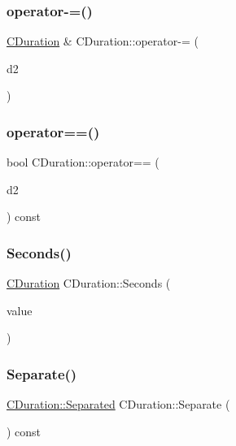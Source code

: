\subsubsection{\texorpdfstring{operator-\/=()}{operator-=()}}
{\footnotesize\ttfamily \mbox{\hyperlink{class_c_duration}{C\+Duration}} \& C\+Duration\+::operator-\/= (\begin{DoxyParamCaption}\item[{const \mbox{\hyperlink{class_c_duration}{C\+Duration}} \&}]{d2 }\end{DoxyParamCaption})}

\mbox{\label{class_c_duration_a1278f84b8c078fee677ab946f12c37b7}} 
\subsubsection{\texorpdfstring{operator==()}{operator==()}}
{\footnotesize\ttfamily bool C\+Duration\+::operator== (\begin{DoxyParamCaption}\item[{const \mbox{\hyperlink{class_c_duration}{C\+Duration}} \&}]{d2 }\end{DoxyParamCaption}) const}

\mbox{\label{class_c_duration_aad9135a51f945440c6dc2ec1c2b19bc7}} 
\subsubsection{\texorpdfstring{Seconds()}{Seconds()}}
{\footnotesize\ttfamily \mbox{\hyperlink{class_c_duration}{C\+Duration}} C\+Duration\+::\+Seconds (\begin{DoxyParamCaption}\item[{long long int}]{value }\end{DoxyParamCaption})\hspace{0.3cm}{\ttfamily [static]}}

\mbox{\label{class_c_duration_a2cd6a0d25796d4c021974394d8c32f54}} 
\subsubsection{\texorpdfstring{Separate()}{Separate()}}
{\footnotesize\ttfamily \mbox{\hyperlink{struct_c_duration_1_1_separated}{C\+Duration\+::\+Separated}} C\+Duration\+::\+Separate (\begin{DoxyParamCaption}{ }\end{DoxyParamCaption}) const}


